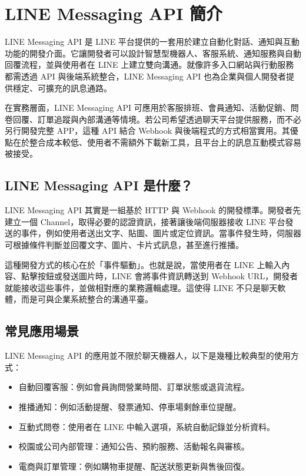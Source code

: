 \chapter{LINE Messaging API 簡介}

LINE Messaging API 是 LINE 平台提供的一套用於建立自動化對話、通知與互動功能的開發介面。它讓開發者可以設計智慧型機器人、客服系統、通知服務與自動回覆流程，並與使用者在 LINE 上建立雙向溝通。就像許多入口網站與行動服務都需透過 API 與後端系統整合，LINE Messaging API 也為企業與個人開發者提供穩定、可擴充的訊息通路。

在實務層面，LINE Messaging API 可應用於客服排班、會員通知、活動促銷、問卷回覆、訂單追蹤與內部溝通等情境。若公司希望透過聊天平台提供服務，而不必另行開發完整 APP，這種 API 結合 Webhook 與後端程式的方式相當實用。其優點在於整合成本較低、使用者不需額外下載新工具，且平台上的訊息互動模式容易被接受。

\section{LINE Messaging API 是什麼？}

LINE Messaging API 其實是一組基於 HTTP 與 Webhook 的開發標準。開發者先建立一個 Channel，取得必要的認證資訊，接著讓後端伺服器接收 LINE 平台發送的事件，例如使用者送出文字、貼圖、圖片或定位資訊。當事件發生時，伺服器可根據條件判斷並回覆文字、圖片、卡片式訊息，甚至進行推播。

這種開發方式的核心在於「事件驅動」。也就是說，當使用者在 LINE 上輸入內容、點擊按鈕或發送圖片時，LINE 會將事件資訊轉送到 Webhook URL，開發者就能接收這些事件，並做相對應的業務邏輯處理。這使得 LINE 不只是聊天軟體，而是可與企業系統整合的溝通平臺。

\section{常見應用場景}

LINE Messaging API 的應用並不限於聊天機器人，以下是幾種比較典型的使用方式：

\begin{itemize}[leftmargin=2em]
    \item 自動回覆客服：例如會員詢問營業時間、訂單狀態或退貨流程。
    \item 推播通知：例如活動提醒、發票通知、停車場剩餘車位提醒。
    \item 互動式問卷：使用者在 LINE 中輸入選項，系統自動記錄並分析資料。
    \item 校園或公司內部管理：通知公告、預約服務、活動報名與審核。
    \item 電商與訂單管理：例如購物車提醒、配送狀態更新與售後回復。
\end{itemize}

